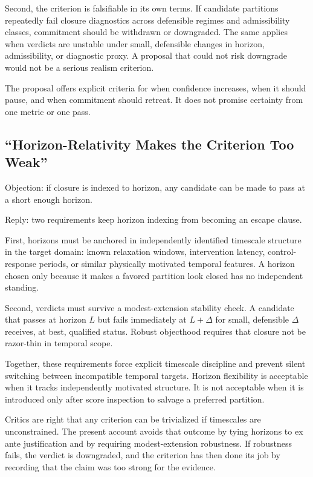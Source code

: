 Second, the criterion is falsifiable in its own terms. If candidate
partitions repeatedly fail closure diagnostics across defensible regimes
and admissibility classes, commitment should be withdrawn or downgraded.
The same applies when verdicts are unstable under small, defensible
changes in horizon, admissibility, or diagnostic proxy. A proposal that
could not risk downgrade would not be a serious realism criterion.

The proposal offers explicit criteria for when confidence increases,
when it should pause, and when commitment should retreat. It does not
promise certainty from one metric or one pass.

\subsection{``Horizon-Relativity Makes the Criterion Too
	Weak''}\label{horizon-relativity-makes-the-criterion-too-weak}

Objection: if closure is indexed to horizon, any candidate can be made
to pass at a short enough horizon.

Reply: two requirements keep horizon indexing from becoming an escape
clause.

First, horizons must be anchored in independently identified timescale
structure in the target domain: known relaxation windows, intervention
latency, control-response periods, or similar physically motivated
temporal features. A horizon chosen only because it makes a favored
partition look closed has no independent standing.

Second, verdicts must survive a modest-extension stability check. A
candidate that passes at horizon $L$ but fails immediately at $L +
	\Delta$ for small, defensible $\Delta$ receives, at best, qualified
status. Robust objecthood requires that closure not be razor-thin in
temporal scope.

Together, these requirements force explicit timescale discipline and
prevent silent switching between incompatible temporal targets. Horizon
flexibility is acceptable when it tracks independently motivated
structure. It is not acceptable when it is introduced only after score
inspection to salvage a preferred partition.

Critics are right that any criterion can be trivialized if timescales
are unconstrained. The present account avoids that outcome by tying
horizons to ex ante justification and by requiring modest-extension
robustness. If robustness fails, the verdict is downgraded, and the
criterion has then done its job by recording that the claim was too
strong for the evidence.

